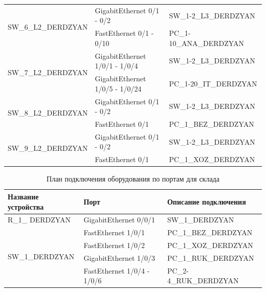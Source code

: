 \begin{table}[H]
\begin{tabularx}{\textwidth}{|X|X|X|}
		\multirow{2}{*}{SW\_6\_L2\_DERDZYAN} & GigabitEthernet 0/1 - 0/2 & SW\_1-2\_L3\_DERDZYAN  \\
		\cline{2-3}
			& FastEthernet 0/1 - 0/10 & PC\_1-10\_ANA\_DERDZYAN \\
		\hline
		\multirow{2}{*}{SW\_7\_L2\_DERDZYAN} & GigabitEthernet 1/0/1 - 1/0/4 & SW\_1-2\_L3\_DERDZYAN  \\
		\cline{2-3}
			& GigabitEthernet 1/0/5 - 1/0/24 & PC\_1-20\_IT\_DERDZYAN \\
		\hline
		\multirow{2}{*}{SW\_8\_L2\_DERDZYAN} & GigabitEthernet 0/1 - 0/2 & SW\_1-2\_L3\_DERDZYAN  \\
		\cline{2-3}
			& FastEthernet 0/1 & PC\_1\_BEZ\_DERDZYAN \\
		\hline
		\multirow{2}{*}{SW\_9\_L2\_DERDZYAN} & GigabitEthernet 0/1 - 0/2 & SW\_1-2\_L3\_DERDZYAN  \\
		\cline{2-3}
			& FastEthernet 0/1 & PC\_1\_XOZ\_DERDZYAN \\
		\hline
    \end{tabularx}
\end{table}

\begin{table}[H]
    \centering
	\caption{План подключения оборудования по портам для склада\label{table:plan_ports_sk}}
    \small
	\begin{tabularx}{\textwidth}{|X|X|X|}
        \hline
		Название устройства& Порт&Описание подключения \\
        \hline
		R\_1\_ DERDZYAN & GigabitEthernet 0/0/1 & SW\_1\_DERDZYAN \\
		\hline
		\multirow{4}{*}{SW\_1\_DERDZYAN} & FastEthernet 1/0/1 &  PC\_1\_BEZ\_DERDZYAN \\
		\cline{2-3}
			& FastEthernet 1/0/2 & PC\_1\_XOZ\_DERDZYAN \\
		\cline{2-3}
			& GigabitEthernet 1/0/3  & PC\_1\_RUK\_DERDZYAN \\
		\cline{2-3}
			& FastEthernet 1/0/4 - 1/0/6 & PC\_2-4\_RUK\_DERDZYAN \\
		\hline
    \end{tabularx}
\end{table}

